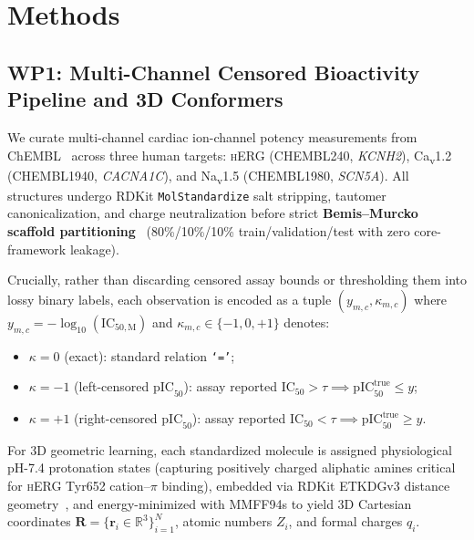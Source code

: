 \documentclass[10pt,twocolumn,letterpaper]{article}
\newcommand{\pic}{\mathrm{pIC}_{50}}
\begin{document}
\section{Methods}
\label{sec:methods}

\subsection{WP1: Multi-Channel Censored Bioactivity Pipeline and 3D Conformers}
\label{sec:wp1}

We curate multi-channel cardiac ion-channel potency measurements from ChEMBL~\cite{zdrazil2024chembl} across three human targets: \textsc{hERG} (CHEMBL240, \textit{KCNH2}), Ca\textsubscript{v}1.2 (CHEMBL1940, \textit{CACNA1C}), and Na\textsubscript{v}1.5 (CHEMBL1980, \textit{SCN5A}). All structures undergo RDKit \texttt{MolStandardize} salt stripping, tautomer canonicalization, and charge neutralization before strict \textbf{Bemis--Murcko scaffold partitioning}~\cite{bemis1996properties} (80\%/10\%/10\% train/validation/test with zero core-framework leakage).

Crucially, rather than discarding censored assay bounds or thresholding them into lossy binary labels, each observation is encoded as a tuple $(y_{m,c}, \kappa_{m,c})$ where $y_{m,c} = -\log_{10}(\mathrm{IC}_{50,\mathrm{M}})$ and $\kappa_{m,c} \in \{-1, 0, +1\}$ denotes:
\begin{itemize}
  \item $\kappa = 0$ (exact): standard relation \texttt{`='};
  \item $\kappa = -1$ (left-censored $\pic$): assay reported $\mathrm{IC}_{50} > \tau \implies \pic^{\mathrm{true}} \le y$;
  \item $\kappa = +1$ (right-censored $\pic$): assay reported $\mathrm{IC}_{50} < \tau \implies \pic^{\mathrm{true}} \ge y$.
\end{itemize}
For 3D geometric learning, each standardized molecule is assigned physiological pH-7.4 protonation states (capturing positively charged aliphatic amines critical for \textsc{hERG} Tyr652 cation--$\pi$ binding), embedded via RDKit ETKDGv3 distance geometry~\cite{riniker2015better}, and energy-minimized with MMFF94s to yield 3D Cartesian coordinates $\mathbf{R} = \{\mathbf{r}_i \in \mathbb{R}^3\}_{i=1}^N$, atomic numbers $Z_i$, and formal charges $q_i$.
\end{document}
